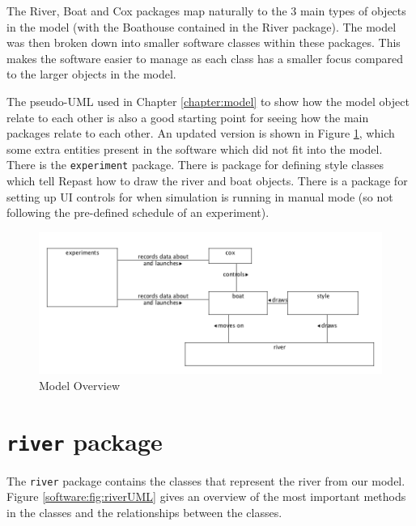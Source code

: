 The River, Boat and Cox packages map
naturally to the 3 main types of objects in the model (with the
Boathouse contained in the River package). The model was
then broken down into smaller software classes within these packages. This
makes the software easier to manage as each class has a smaller focus
compared to the larger objects in the model.

The pseudo-UML used in Chapter \ref{chapter:model} to show how the model object relate to each other is also a
good starting point for seeing how the main packages relate to each
other. An updated version is shown in Figure \ref{software:fig:modeloverview}, which some extra entities present in the software which did not fit into the model. There
is the \texttt{experiment} package. There is package for defining style
classes which tell Repast how to draw the river and boat
objects. There is a package for setting up UI controls for when
simulation is running in manual mode (so not following the
pre-defined schedule of an experiment).

\begin{figure}
\begin{center}
  \includegraphics[scale=0.3]{images/packages.png}
  \caption{Model Overview}
  \label{software:fig:modeloverview}
\end{center}
\end{figure}



\section{\texttt{river} package}
The \texttt{river} package contains the classes that represent the river from our model. Figure \ref{software:fig:riverUML} gives an overview of the most important methods in the classes and the relationships between the classes.

